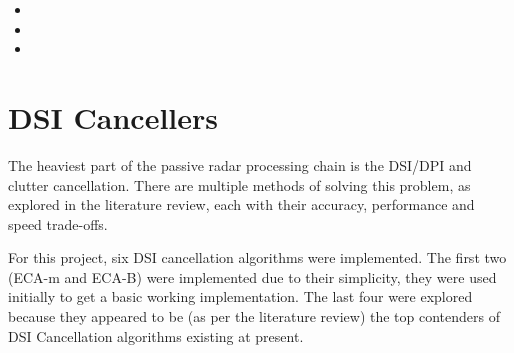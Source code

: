 \begin{itemize}
    \item {}
    \item {}
    \item {}
\end{itemize}


\section{DSI Cancellers}
\label{sec:ch4.dsi}
The heaviest part of the passive radar processing chain is the DSI/DPI and clutter cancellation. There are multiple methods of solving this problem, as explored in the literature review, each with their accuracy, performance and speed trade-offs. 

For this project, six DSI cancellation algorithms were implemented. The first two (ECA-m and ECA-B) were implemented due to their simplicity, they were used initially to get a basic working implementation. The last four were explored because they appeared to be (as per the literature review) the top contenders of DSI Cancellation algorithms existing at present.
